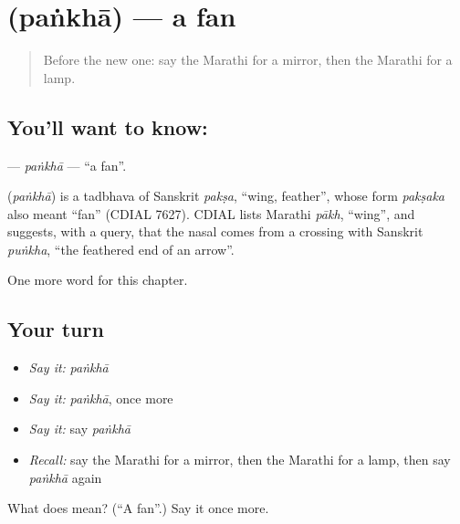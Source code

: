 \section[\texorpdfstring{\mr{पंखा} (paṅkhā)}{पंखा (paṅkhā)}]{ (paṅkhā) — a fan}

\label{lesson:MR-C91-pankha}



\begin{quote}
Before the new one: say the Marathi for a mirror, then the Marathi for a lamp.
\end{quote}

\subsection*{You'll want to know: }
\textbf{} — \emph{paṅkhā} — \textquotedblleft{}a fan\textquotedblright{}.

\begin{cousinweb}
\textbf{} (\emph{paṅkhā}) is a tadbhava of Sanskrit \emph{pakṣa}, \textquotedblleft{}wing, feather\textquotedblright{}, whose form \emph{pakṣaka} also meant \textquotedblleft{}fan\textquotedblright{} (CDIAL 7627). CDIAL lists Marathi \emph{pākh}, \textquotedblleft{}wing\textquotedblright{}, and suggests, with a query, that the nasal comes from a crossing with Sanskrit \emph{puṅkha}, \textquotedblleft{}the feathered end of an arrow\textquotedblright{}.
\end{cousinweb}

\begin{grammarlens}[title={What you've built}]
One more word for this chapter.
\end{grammarlens}

\subsection*{Your turn}
\begin{itemize}
\raggedright
  \item \emph{Say it:} \emph{paṅkhā}
  \item \emph{Say it:} \emph{paṅkhā}, once more
  \item \emph{Say it:} say \emph{paṅkhā}
  \item \emph{Recall:} say the Marathi for a mirror, then the Marathi for a lamp, then say \emph{paṅkhā} again
\end{itemize}

\begin{tcolorbox}[breakable,colback=teal!4,colframe=teal!35!black,title={Before you move on}]
What does  mean? (\textquotedblleft{}A fan\textquotedblright{}.) Say it once more.
\end{tcolorbox}
